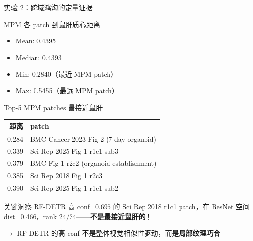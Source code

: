 \documentclass[aspectratio=169, 10pt]{beamer}
\begin{document}
\begin{frame}{实验 2：跨域鸿沟的定量证据}
  \begin{block}{MPM 各 patch 到鼠肝质心距离}
    \begin{itemize}
      \item Mean: 0.4395
      \item Median: 0.4393
      \item Min: 0.2840（最近 MPM patch）
      \item Max: 0.5455（最远 MPM patch）
    \end{itemize}
  \end{block}
  \vspace{-0.3em}
  \begin{block}{Top-5 MPM patches 最接近鼠肝}
    \scriptsize
    \begin{tabular}{rl}
      \toprule
      \textbf{距离} & \textbf{patch} \\
      \midrule
      0.284 & BMC Cancer 2023 Fig 2 (7-day organoid) \\
      0.339 & Sci Rep 2025 Fig 1 r1c1 sub3 \\
      0.379 & BMC Fig 1 r2c2 (organoid establishment) \\
      0.385 & Sci Rep 2018 Fig 1 r2c3 \\
      0.390 & Sci Rep 2025 Fig 1 r1c1 sub2 \\
      \bottomrule
    \end{tabular}
  \end{block}
  \vspace{-0.3em}
  \begin{alertblock}{关键洞察}
    RF-DETR 高 conf=0.696 的 Sci Rep 2018 r1c1 patch，在 ResNet 空间 dist=0.466，rank 24/34——\textbf{不是最接近鼠肝的}！
    
    $\to$ RF-DETR 的高 conf 不是整体视觉相似性驱动，而是\textbf{局部纹理巧合}
  \end{alertblock}
\end{frame}
\end{document}
